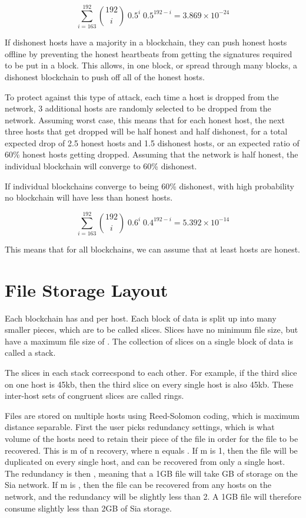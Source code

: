 \documentclass[twocolumn]{article}
\begin{document}
\begin{equation}
\sum_{i=163}^{192} {192 \choose i} \; 0.5^{i} \; 0.5^{192-i} = 3.869\times10^{-24}
\end{equation}

If dishonest hosts have a majority in a blockchain, they can push honest hosts offline by preventing the honest heartbeats from getting the signatures required to be put in a block.
This allows, in one block, or spread through many blocks, a dishonest blockchain to push off all of the honest hosts.

To protect against this type of attack, each time a host is dropped from the network, 3 additional hosts are randomly selected to be dropped from the network.
Assuming worst case, this means that for each honest host, the next three hosts that get dropped will be half honest and half dishonest, for a total expected drop of 2.5 honest hosts and 1.5 dishonest hosts, or an expected ratio of 60\% honest hosts getting dropped.
Assuming that the network is half honest, the individual blockchain will converge to 60\% dishonest.

If individual blockchains converge to being 60\% dishonest, with high probability no blockchain will have less than \inversemaxcorruption{} honest hosts.

\begin{equation}
\sum_{i=163}^{192} {192 \choose i} \; 0.6^{i} \; 0.4^{192-i} = 5.392\times10^{-14}
\end{equation}

This means that for all blockchains, we can assume that at least \inversemaxcorruption{} hosts are honest.

\section{File Storage Layout}

Each blockchain has \numhosts{} and \storageperhost{} per host.
Each \storageperhost{} block of data is split up into many smaller pieces, which are to be called slices.
Slices have no minimum file size, but have a maximum file size of \maxslicesize.
The collection of slices on a single block of data is called a stack.

The slices in each stack correcspond to each other.
For example, if the third slice on one host is 45kb, then the third slice on every single host is also 45kb.
These inter-host sets of congruent slices are called rings.

Files are stored on multiple hosts using Reed-Solomon coding, which is maximum distance separable.
First the user picks redundancy settings, which is what volume of the hosts need to retain their piece of the file in order for the file to be recovered.
This is m of n recovery, where n equals \numhosts.
If m is 1, then the file will be duplicated on every single host, and can be recovered from only a single host.
The redundancy is then \numhosts{}, meaning that a 1GB file will take \numhosts GB of storage on the Sia network.
If m is \fiftyone, then the file can be recovered from any \fiftyone{} hosts on the network, and the redundancy will be slightly less than 2.
A 1GB file will therefore consume slightly less than 2GB of Sia storage.
\end{document}
